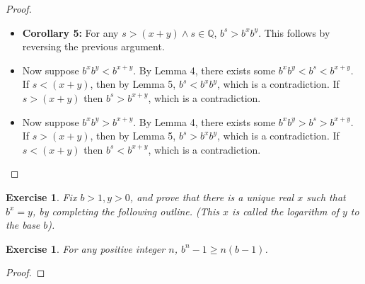 \documentclass[12pt]{article}
\newtheorem{exercise}{Exercise}[section]
\newtheorem{subexercise}{Exercise}[exercise]
\newcommand{\Q}{\mathbb{Q}}
\begin{document}
\begin{proof}
\begin{itemize}
\begin{itemize}
            \end{itemize}
        \item \textbf{Corollary 5:} For any $s > (x+y) \land s \in \Q$, $b^s > b^x b^y$. This follows by reversing the previous argument.
        \item Now suppose $b^x b^y < b^{x+y}$. By Lemma 4, there exists some $b^x b^y <b^s< b^{x+y}$. If $s<(x+y)$, then by Lemma 5, $b^s < b^x b^y$, which is a contradiction. If $s>(x+y)$ then $b^s > b^{x+y}$, which is a contradiction.
        \item Now suppose $b^x b^y > b^{x+y}$. By Lemma 4, there exists some $b^x b^y > b^s > b^{x+y}$. If $s>(x+y)$, then by Lemma 5, $b^s > b^x b^y$, which is a contradiction. If $s<(x+y)$ then $b^s < b^{x+y}$, which is a contradiction.
    \end{itemize}
\end{proof}

\begin{exercise}
    Fix $b > 1, y > 0$, and prove that there is a unique real $x$ such that $b^x = y$, by completing the following outline. (This $x$ is called the \textit{logarithm of $y$ to the base $b$}).
\end{exercise}

\begin{subexercise}
    For any positive integer $n$, $b^n - 1 \geq n(b-1)$.
\end{subexercise}

\begin{proof}
    
\end{proof}
\end{document}
